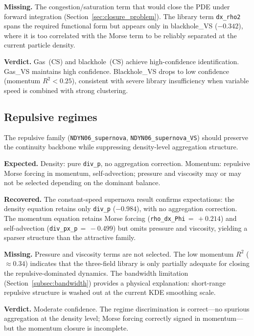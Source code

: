 \noindent\textbf{Missing.}
The congestion/saturation term that would close the PDE under forward
integration (Section~\ref{sec:closure_problem}).  The library term
\texttt{dx\_rho2} spans the required functional form but appears only in
blackhole\_VS ($-0.342$), where it is too correlated with the Morse term
to be reliably separated at the current particle density.

\noindent\textbf{Verdict.}
Gas~(CS) and blackhole~(CS) achieve high-confidence identification.
Gas\_VS maintains high confidence.  Blackhole\_VS drops to low confidence
(momentum $R^2 < 0.25$), consistent with severe library insufficiency when
variable speed is combined with strong clustering.

\subsection{Repulsive regimes}
\label{subsec:interp_repulsive}

The repulsive family (\texttt{NDYN06\_supernova},
\texttt{NDYN06\_supernova\_VS}) should preserve the continuity backbone
while suppressing density-level aggregation structure.

\noindent\textbf{Expected.}
Density: pure \texttt{div\_p}, no aggregation correction.
Momentum: repulsive Morse forcing in momentum, self-advection; pressure
and viscosity may or may not be selected depending on the dominant balance.

\noindent\textbf{Recovered.}
The constant-speed supernova result confirms expectations: the density
equation retains only \texttt{div\_p} ($-0.984$), with no aggregation
correction.  The momentum equation retains Morse forcing
(\texttt{rho\_dx\_Phi}${}\,=\,+0.214$) and self-advection
(\texttt{div\_px\_p}${}\,=\,-0.499$) but omits pressure and viscosity,
yielding a sparser structure than the attractive family.

\noindent\textbf{Missing.}
Pressure and viscosity terms are not selected.  The low momentum $R^2$
($\approx 0.34$) indicates that the three-field library is only partially
adequate for closing the repulsive-dominated dynamics.  The
bandwidth limitation (Section~\ref{subsec:bandwidth}) provides a physical
explanation: short-range repulsive structure is washed out at the current
KDE smoothing scale.

\noindent\textbf{Verdict.}
Moderate confidence.  The regime discrimination is correct---no spurious
aggregation at the density level; Morse forcing correctly signed in
momentum---but the momentum closure is incomplete.

